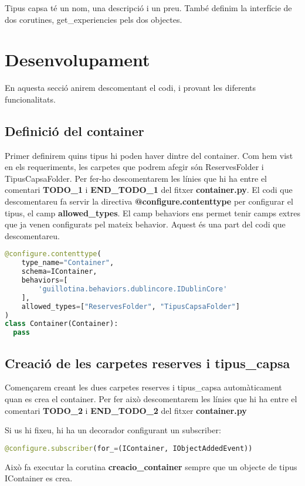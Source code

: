 \documentclass[a4paper, 11pt]{article}
\begin{document}
  Tipus capsa té un nom, una descripció i un preu. També definim la
  interfície de dos corutines, get\_experiencies pels dos objectes.

\section{Desenvolupament}
En aquesta secció anirem descomentant el codi, i provant les diferents
funcionalitats.
\subsection{Definició del container}
Primer definirem quins tipus hi poden haver dintre del container. Com
hem vist en els requeriments, les carpetes que podrem afegir són
ReservesFolder i TipusCapsaFolder. Per fer-ho descomentarem les línies
que hi ha entre el comentari \textbf{TODO\_1} i \textbf{END\_TODO\_1}
del fitxer \textbf{container.py}. El codi que descomentareu fa servir
la directiva \textbf{{@}configure.contenttype} per configurar el
tipus, el camp \textbf{allowed\_types}. El camp behaviors ens permet
tenir camps extres que ja venen configurats pel mateix
behavior. Aquest és una part del codi que descomentareu.

\begin{lstlisting}[language=Python, caption=Definició container]
@configure.contenttype(
    type_name="Container",
    schema=IContainer,
    behaviors=[
        'guillotina.behaviors.dublincore.IDublinCore'
    ],
    allowed_types=["ReservesFolder", "TipusCapsaFolder"]
)
class Container(Container):
  pass
\end{lstlisting}


\subsection{Creació de les carpetes reserves i tipus\_capsa}
Començarem creant les dues carpetes reserves i tipus\_capsa
automàticament quan es crea el container. Per fer això descomentarem
les línies que hi ha entre el comentari \textbf{TODO\_2} i
\textbf{END\_TODO\_2} del fitxer \textbf{container.py}

Si us hi fixeu, hi ha un decorador configurant un subscriber:
\begin{lstlisting}[language=Python, caption=Subscriber container]
  @configure.subscriber(for_=(IContainer, IObjectAddedEvent))
\end{lstlisting}
Això fa executar la corutina \textbf{creacio\_container} sempre que un objecte
de tipus IContainer es crea.
  
\end{document}
